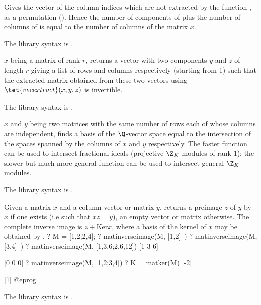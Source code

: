 \label{se:matimagecompl}
Gives the vector of the column indices which
are not extracted by the function , as a permutation
(). Hence the number of
components of  plus the number of columns of
 is equal to the number of columns of the matrix $x$.

The library syntax is .

\label{se:matindexrank}
$x$ being a matrix of rank $r$, returns a vector with two
 components $y$ and $z$ of length $r$ giving a list of rows
and columns respectively (starting from 1) such that the extracted matrix
obtained from these two vectors using $\tet{vecextract}(x,y,z)$ is
invertible.

The library syntax is .

\label{se:matintersect}
$x$ and $y$ being two matrices with the same
number of rows each of whose columns are independent, finds a basis of the
$\Q$-vector space equal to the intersection of the spaces spanned by the
columns of $x$ and $y$ respectively. The faster function
 can be used to intersect fractional ideals (projective
$\Z_K$ modules of rank $1$); the slower but much more general function
 can be used to intersect general $\Z_K$-modules.

The library syntax is .

\label{se:matinverseimage}
Given a matrix $x$ and
a column vector or matrix $y$, returns a preimage $z$ of $y$ by $x$ if one
exists (i.e such that $x z = y$), an empty vector or matrix otherwise. The
complete inverse image is $z + \text{Ker} x$, where a basis of the kernel of
$x$ may be obtained by .
\bprog
? M = [1,2;2,4];
? matinverseimage(M, [1,2]~)
? matinverseimage(M, [3,4]~)
? matinverseimage(M, [1,3,6;2,6,12])
[1 3 6]

[0 0 0]
? matinverseimage(M, [1,2;3,4])
? K = matker(M)
[-2]

[1]
@eprog

The library syntax is .

